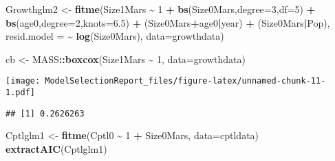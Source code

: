 \documentclass[
]{article}
\newenvironment{Shaded}{\begin{snugshade}}{\end{snugshade}}
\newcommand{\AttributeTok}[1]{\textcolor[rgb]{0.13,0.29,0.53}{#1}}
\newcommand{\DecValTok}[1]{\textcolor[rgb]{0.00,0.00,0.81}{#1}}
\newcommand{\FloatTok}[1]{\textcolor[rgb]{0.00,0.00,0.81}{#1}}
\newcommand{\FunctionTok}[1]{\textcolor[rgb]{0.13,0.29,0.53}{\textbf{#1}}}
\newcommand{\NormalTok}[1]{#1}
\newcommand{\OtherTok}[1]{\textcolor[rgb]{0.56,0.35,0.01}{#1}}
\newcommand{\SpecialCharTok}[1]{\textcolor[rgb]{0.81,0.36,0.00}{\textbf{#1}}}
\begin{document}
\begin{Shaded}
\begin{Highlighting}[]
\NormalTok{Growthglm2 }\OtherTok{\textless{}{-}} \FunctionTok{fitme}\NormalTok{(Size1Mars }\SpecialCharTok{\textasciitilde{}} \DecValTok{1} \SpecialCharTok{+}
                      \FunctionTok{bs}\NormalTok{(Size0Mars,}\AttributeTok{degree=}\DecValTok{3}\NormalTok{,}\AttributeTok{df=}\DecValTok{5}\NormalTok{) }\SpecialCharTok{+} \FunctionTok{bs}\NormalTok{(age0,}\AttributeTok{degree=}\DecValTok{2}\NormalTok{,}\AttributeTok{knots=}\FloatTok{6.5}\NormalTok{) }\SpecialCharTok{+}
\NormalTok{                      (Size0Mars}\SpecialCharTok{+}\NormalTok{age0}\SpecialCharTok{|}\NormalTok{year) }\SpecialCharTok{+}\NormalTok{ (Size0Mars}\SpecialCharTok{|}\NormalTok{Pop),}
                    \AttributeTok{resid.model =} \SpecialCharTok{\textasciitilde{}} \FunctionTok{log}\NormalTok{(Size0Mars),}
                    \AttributeTok{data=}\NormalTok{growthdata)}

\NormalTok{cb }\OtherTok{\textless{}{-}}\NormalTok{ MASS}\SpecialCharTok{::}\FunctionTok{boxcox}\NormalTok{(Size1Mars }\SpecialCharTok{\textasciitilde{}} \DecValTok{1}\NormalTok{, }\AttributeTok{data=}\NormalTok{growthdata)}
\end{Highlighting}
\end{Shaded}

\texttt{[image: ModelSelectionReport\_files/figure-latex/unnamed-chunk-11-1.pdf]}

\begin{Shaded}
\end{Shaded}

\begin{verbatim}
## [1] 0.2626263
\end{verbatim}

\begin{Shaded}
\begin{Highlighting}[]
\NormalTok{Cptlglm1 }\OtherTok{\textless{}{-}} \FunctionTok{fitme}\NormalTok{(Cptl0 }\SpecialCharTok{\textasciitilde{}} \DecValTok{1} \SpecialCharTok{+}\NormalTok{ Size0Mars, }
                  \AttributeTok{data=}\NormalTok{cptldata)}
\FunctionTok{extractAIC}\NormalTok{(Cptlglm1)}
\end{Highlighting}
\end{Shaded}
\end{document}
